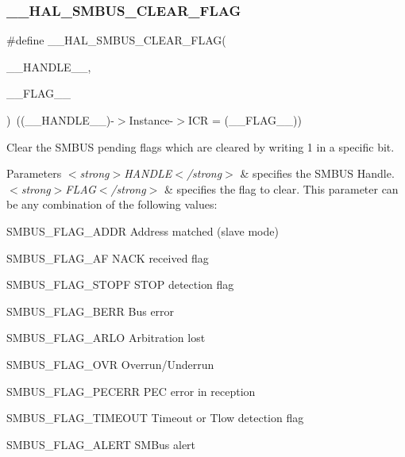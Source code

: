 \subsubsection{\texorpdfstring{\+\_\+\+\_\+\+H\+A\+L\+\_\+\+S\+M\+B\+U\+S\+\_\+\+C\+L\+E\+A\+R\+\_\+\+F\+L\+AG}{\_\_HAL\_SMBUS\_CLEAR\_FLAG}}
{\footnotesize\ttfamily \#define \+\_\+\+\_\+\+H\+A\+L\+\_\+\+S\+M\+B\+U\+S\+\_\+\+C\+L\+E\+A\+R\+\_\+\+F\+L\+AG(\begin{DoxyParamCaption}\item[{}]{\+\_\+\+\_\+\+H\+A\+N\+D\+L\+E\+\_\+\+\_\+,  }\item[{}]{\+\_\+\+\_\+\+F\+L\+A\+G\+\_\+\+\_\+ }\end{DoxyParamCaption})~((\+\_\+\+\_\+\+H\+A\+N\+D\+L\+E\+\_\+\+\_\+)-\/$>$Instance-\/$>$I\+CR = (\+\_\+\+\_\+\+F\+L\+A\+G\+\_\+\+\_\+))}



Clear the S\+M\+B\+US pending flags which are cleared by writing 1 in a specific bit. 


\begin{DoxyParams}{Parameters}
{\em $<$strong$>$\+H\+A\+N\+D\+L\+E$<$/strong$>$} & specifies the S\+M\+B\+US Handle. \\
\hline
{\em $<$strong$>$\+F\+L\+A\+G$<$/strong$>$} & specifies the flag to clear. This parameter can be any combination of the following values\+: \begin{DoxyItemize}
\item S\+M\+B\+U\+S\+\_\+\+F\+L\+A\+G\+\_\+\+A\+D\+DR Address matched (slave mode) \item S\+M\+B\+U\+S\+\_\+\+F\+L\+A\+G\+\_\+\+AF N\+A\+CK received flag \item S\+M\+B\+U\+S\+\_\+\+F\+L\+A\+G\+\_\+\+S\+T\+O\+PF S\+T\+OP detection flag \item S\+M\+B\+U\+S\+\_\+\+F\+L\+A\+G\+\_\+\+B\+E\+RR Bus error \item S\+M\+B\+U\+S\+\_\+\+F\+L\+A\+G\+\_\+\+A\+R\+LO Arbitration lost \item S\+M\+B\+U\+S\+\_\+\+F\+L\+A\+G\+\_\+\+O\+VR Overrun/\+Underrun \item S\+M\+B\+U\+S\+\_\+\+F\+L\+A\+G\+\_\+\+P\+E\+C\+E\+RR P\+EC error in reception \item S\+M\+B\+U\+S\+\_\+\+F\+L\+A\+G\+\_\+\+T\+I\+M\+E\+O\+UT Timeout or Tlow detection flag \item S\+M\+B\+U\+S\+\_\+\+F\+L\+A\+G\+\_\+\+A\+L\+E\+RT S\+M\+Bus alert\end{DoxyItemize}
\\
\hline
\end{DoxyParams}


